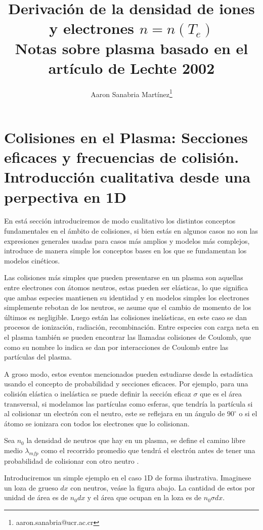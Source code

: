 \documentclass[11pt]{article}
\title{Derivaci\'on de la densidad de iones y electrones $n = n(T_e)$ \\ \small{Notas sobre plasma basado en el art\'iculo de Lechte 2002} \cite{lechte2002}}
\author{Aaron Sanabria Mart\'inez\footnote{aaron.sanabria@ucr.ac.cr}}
\theoremstyle{definition}
\begin{document}
  \maketitle
	\thispagestyle{empty}

  \section{Colisiones en el Plasma: Secciones eficaces y frecuencias de colisi\'on. Introducci\'on cualitativa desde una perpectiva en 1D}

  En est\'a secci\'on introduciremos de modo cualitativo los distintos conceptos fundamentales en el \'ambito de colisiones, si bien est\'as en algunos casos no son las expresiones generales usadas para casos m\'as amplios y modelos m\'as complejos, introduce de manera simple los conceptos bases en los que se fundamentan los modelos cin\'eticos. 

  Las colisiones m\'as simples que pueden presentarse en un plasma son aquellas entre electrones con \'atomos neutros, estas pueden ser el\'asticas, lo que significa que ambas especies mantienen su identidad y en modelos simples los electrones simplemente rebotan de los neutros, se asume que el cambio de momento de los \'ultimos es negligible. Luego est\'an las colisiones inel\'asticas, en este caso se dan procesos de ionizaci\'on, radiaci\'on, recombinaci\'on. Entre especies con carga neta en el plasma tambi\'en se pueden encontrar las llamadas colisiones de Coulomb, que como su nombre lo indica se dan por interacciones de Coulomb entre las part\'iculas del plasma. 

  A groso modo, estos eventos mencionados pueden estudiarse desde la estad\'istica usando el concepto de probabilidad y secciones eficaces. Por ejemplo, para una colisi\'on el\'astica o inel\'astica se puede definir la secci\'on eficaz $\sigma$ que es el \'area transversal, si modelamos las part\'iculas como esferas, que tendr\'ia la part\'icula si al colisionar un electr\'on con el neutro, este se reflejara en un \'angulo de $90^\circ$ o si el \'atomo se ionizara con todos los electrones que lo colisionan.

    Sea $n_0$ la densidad de neutros que hay en un plasma, se define el camino libre medio $\lambda_{mfp}$ como el recorrido promedio que tendr\'a el electr\'on antes de tener una probabilidad de colisionar con otro neutro \cite{goldston1995}. 

    Introduciremos un simple ejemplo en el caso 1D de forma ilustrativa. Imaginese un loza de grueso $dx$ con neutros, ve\'ase la figura abajo. La cantidad de estos por unidad de \'area es de $n_0dx$ y el \'area que ocupan en la loza es de $n_0 \sigma dx$. 
\end{document}
